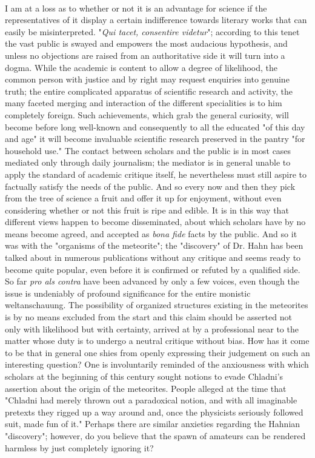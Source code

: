 \documentclass[a4paper, 12pt, oneside]{article}
\begin{document}
\paragraph{}
I am at a loss as to whether or not it is an advantage for science if the representatives of it display a certain indifference towards literary works that can easily be misinterpreted. "\emph{Qui tacet, consentire videtur}"; according to this tenet the vast public is swayed and empowers the most audacious hypothesis, and unless no objections are raised from an authoritative side it will turn into a dogma. While the academic is content to allow a degree of likelihood, the common person with justice and by right may request enquiries into genuine truth; the entire complicated apparatus of scientific research and activity, the many faceted merging and interaction of the different specialities is to him completely foreign. Such achievements, which grab the general curiosity, will become before long well-known and consequently to all the educated "of this day and age" it will become invaluable scientific research preserved in the pantry "for household use." The contact between scholars and the public is in most cases mediated only through daily journalism; the mediator is in general unable to apply the standard of academic critique itself, he nevertheless must still aspire to factually satisfy the needs of the public. And so every now and then they pick from the tree of science a fruit and offer it up for enjoyment, without even considering whether or not this fruit is ripe and edible. It is in this way that different views happen to become disseminated, about which scholars have by no means become agreed, and accepted as \emph{bona fide} facts by the public. And so it was with the "organisms of the meteorite"; the "discovery" of Dr. Hahn has been talked about in numerous publications without any critique and seems ready to become quite popular, even before it is confirmed or refuted by a qualified side. So far \emph{pro als contra} have been advanced by only a few voices, even though the issue is undeniably of profound significance for the entire monistic weltanschauung. The possibility of organized structures existing in the meteorites is by no means excluded from the start and this claim should be asserted not only with likelihood but with certainty, arrived at by a professional near to the matter whose duty is to undergo a neutral critique without bias. How has it come to be that in general one shies from openly expressing their judgement on such an interesting question? One is involuntarily reminded of the anxiousness with which scholars at the beginning of this century sought notions to evade Chladni's assertion about the origin of the meteorites. People alleged at the time that "Chladni had merely thrown out a paradoxical notion, and with all imaginable pretexts they rigged up a way around and, once the physicists seriously followed suit, made fun of it." Perhaps there are similar anxieties regarding the Hahnian "discovery"; however, do you believe that the spawn of amateurs can be rendered harmless by just completely ignoring it?
\end{document}
